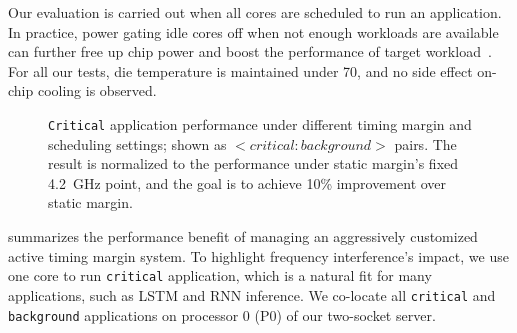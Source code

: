 Our evaluation is carried out when all cores are scheduled to run an application. In practice, power gating idle cores off when not enough workloads are available can further free up chip power and boost the performance of target workload~\cite{zu2015adaptive}. For all our tests, die temperature is maintained under 70\C, and no side effect on-chip cooling is observed. 

\begin{figure}
\centering 
{}

\caption{\texttt{Critical} application performance under different timing margin and scheduling settings; shown as $<\!critical:background\!>$ pairs. The result is normalized to the performance under static margin's fixed 4.2~GHz point, and the goal is to achieve 10\% improvement over static margin.}

\label{fig:schedule-1t-results}
\end{figure}

 summarizes the performance benefit of managing an aggressively customized active timing margin system. To highlight frequency interference's impact, we use one core to run \texttt{critical} application, which is a natural fit for many applications, such as LSTM and RNN inference. We co-locate all \texttt{critical} and \texttt{background} applications on processor 0 (P0) of our two-socket server.

